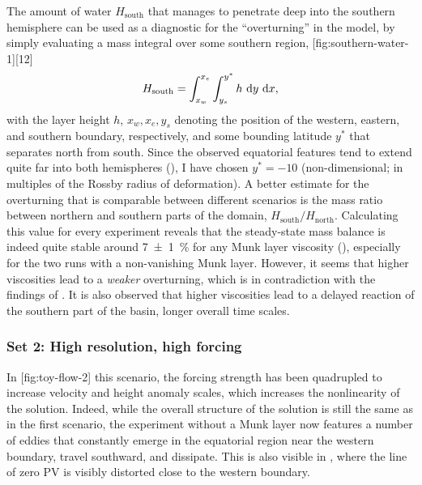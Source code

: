 The amount of water \(H_\text{south}\) that manages to penetrate deep into the southern hemisphere can be used as a diagnostic for the \enquote{overturning} in the model, by simply evaluating a mass integral over some southern region, \ie%
[fig:southern-water-1]{}[12]%
%
\begin{equation}
	H_\text{south} = \int_{x_w}^{x_e} \int_{y_s}^{y^*} h ~\text{d}y ~\text{d}x,
\end{equation}
%
with the layer height \(h\), \(x_w, x_e, y_s\) denoting the position of the western, eastern, and southern boundary, respectively, and some bounding latitude \(y^*\) that separates north from south. Since the observed equatorial features tend to extend quite far into both hemispheres (), I have chosen \(y^* = -10\) (non-dimensional; in multiples of the Rossby radius of deformation). A better estimate for the overturning that is comparable between different scenarios is the mass ratio between northern and southern parts of the domain, \ie \(H_\text{south} / H_\text{north}\). Calculating this value for every experiment reveals that the steady-state mass balance is indeed quite stable around \SI{7(1)}{\percent} for any Munk layer viscosity (), especially for the two runs with a non-vanishing Munk layer. However, it seems that higher viscosities lead to a \emph{weaker} overturning, which is in contradiction with the findings of . It is also observed that higher viscosities lead to a delayed reaction of the southern part of the basin, \ie longer overall time scales.

\clearpage
\subsubsection{Set 2: High resolution, high forcing}
In%
[fig:toy-flow-2]{}%
%
this scenario, the forcing strength has been quadrupled to increase velocity and height anomaly scales, which increases the nonlinearity of the solution. Indeed, while the overall structure of the solution is still the same as in the first scenario, the experiment without a Munk layer now features a number of eddies that constantly emerge in the equatorial region near the western boundary, travel southward, and dissipate. This is also visible in , where the line of zero \ac{PV} is visibly distorted close to the western boundary.

